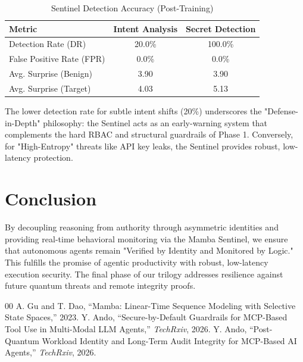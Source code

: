 \documentclass[conference]{IEEEtran}
\begin{document}
\begin{table}[htbp]
\caption{Sentinel Detection Accuracy (Post-Training)}
\begin{center}
\begin{tabular}{|l|c|c|}
\hline
\textbf{Metric} & \textbf{Intent Analysis} & \textbf{Secret Detection} \\
\hline
Detection Rate (DR) & 20.0\% & 100.0\% \\
False Positive Rate (FPR) & 0.0\% & 0.0\% \\
Avg. Surprise (Benign) & 3.90 & 3.90 \\
Avg. Surprise (Target) & 4.03 & 5.13 \\
\hline
\end{tabular}
\label{tab:detection_acc}
\end{center}
\end{table}

The lower detection rate for subtle intent shifts (20\%) underscores the "Defense-in-Depth" philosophy: the Sentinel acts as an early-warning system that complements the hard RBAC and structural guardrails of Phase 1. Conversely, for "High-Entropy" threats like API key leaks, the Sentinel provides robust, low-latency protection.

\section{Conclusion}
By decoupling reasoning from authority through asymmetric identities and providing real-time behavioral monitoring via the Mamba Sentinel, we ensure that autonomous agents remain "Verified by Identity and Monitored by Logic." This fulfills the promise of agentic productivity with robust, low-latency execution security. The final phase of our trilogy addresses resilience against future quantum threats and remote integrity proofs.

\begin{thebibliography}{00}
 A. Gu and T. Dao, ``Mamba: Linear-Time Sequence Modeling with Selective State Spaces,'' 2023.
 Y. Ando, ``Secure-by-Default Guardrails for MCP-Based Tool Use in Multi-Modal LLM Agents,'' \textit{TechRxiv}, 2026.
 Y. Ando, ``Post-Quantum Workload Identity and Long-Term Audit Integrity for MCP-Based AI Agents,'' \textit{TechRxiv}, 2026.
\end{thebibliography}
\end{document}
